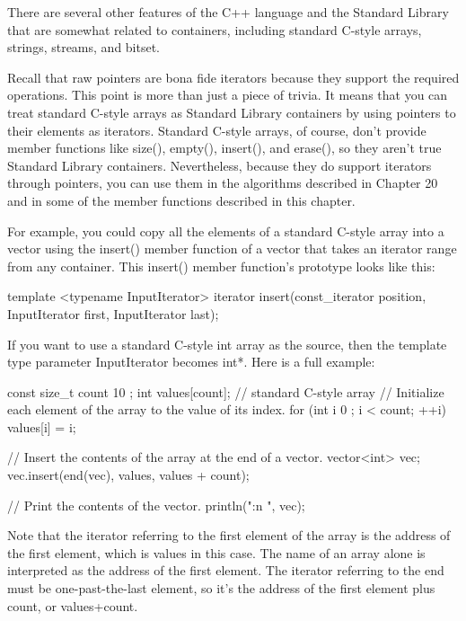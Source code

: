 
There are several other features of the C++ language and the Standard Library that are somewhat related to containers, including standard C-style arrays, strings, streams, and bitset.


Recall that raw pointers are bona fide iterators because they support the required operations. This point is more than just a piece of trivia. It means that you can treat standard C-style arrays as Standard Library containers by using pointers to their elements as iterators. Standard C-style arrays, of course, don’t provide member functions like size(), empty(), insert(), and erase(), so they aren’t true Standard Library containers. Nevertheless, because they do support iterators through pointers, you can use them in the algorithms described in Chapter 20 and in some of the member functions described in this chapter.

For example, you could copy all the elements of a standard C-style array into a vector using the insert() member function of a vector that takes an iterator range from any container. This insert() member function’s prototype looks like this:

\begin{cpp}
template <typename InputIterator> iterator insert(const_iterator position,
    InputIterator first, InputIterator last);
\end{cpp}

If you want to use a standard C-style int array as the source, then the template type parameter InputIterator becomes int*. Here is a full example:

\begin{cpp}
const size_t count { 10 };
int values[count]; // standard C-style array
// Initialize each element of the array to the value of its index.
for (int i { 0 }; i < count; ++i) { values[i] = i; }

// Insert the contents of the array at the end of a vector.
vector<int> vec;
vec.insert(end(vec), values, values + count);

// Print the contents of the vector.
println("{:n} ", vec);
\end{cpp}

Note that the iterator referring to the first element of the array is the address of the first element, which is values in this case. The name of an array alone is interpreted as the address of the first element. The iterator referring to the end must be one-past-the-last element, so it’s the address of the first element plus count, or values+count.

